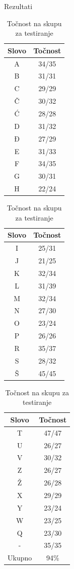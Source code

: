 \documentclass{beamer}
\begin{document}
\begin{frame}{Rezultati}
\begin{table}[]
\scalebox{0.95} {
\begin{minipage}{.33\linewidth}
      \centering
        \begin{tabular}{c|c}
Slovo & Točnost \\ \hline
A & 34/35 \\ \hline
B & 31/31 \\ \hline
C & 29/29 \\ \hline
Č & 30/32 \\ \hline
Ć & 28/28 \\ \hline
D & 31/32 \\ \hline
Đ & 27/29 \\ \hline
E & 31/33 \\ \hline
F & 34/35 \\ \hline
G & 30/31 \\ \hline
H & 22/24 \\ \hline
        \end{tabular}
    \end{minipage}
\begin{minipage}{.33\linewidth}
      \centering
        \begin{tabular}{c|c}
Slovo & Točnost \\ \hline
I & 25/31 \\ \hline
J & 21/25 \\ \hline
K & 32/34 \\ \hline
L & 31/39 \\ \hline
M & 32/34 \\ \hline
N & 27/30 \\ \hline
O & 23/24 \\ \hline
P & 26/26 \\ \hline
R & 35/37 \\ \hline
S & 28/32 \\ \hline
Š & 45/45 \\ \hline
        \end{tabular}
    \end{minipage}
\begin{minipage}{.33\linewidth}
      \centering
        \begin{tabular}{c|c}
Slovo & Točnost \\ \hline
T & 47/47 \\ \hline
U & 26/27 \\ \hline
V & 30/32 \\ \hline
Z & 26/27 \\ \hline
Ž & 26/28 \\ \hline
X & 29/29 \\ \hline
Y & 23/24 \\ \hline
W & 23/25 \\ \hline
Q & 23/30 \\ \hline
- & 35/35 \\ \hline
Ukupno & 94\% \\ \hline
        \end{tabular}
    \end{minipage}
}
\caption{Točnost na skupu za testiranje}
\end{table}
\end{frame}
\end{document}
